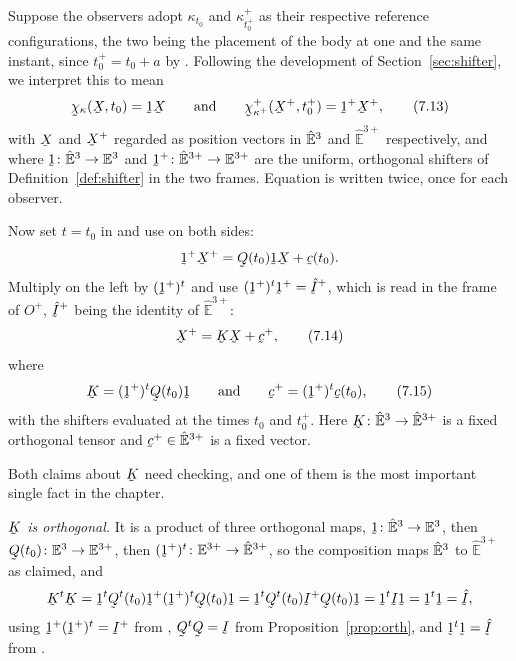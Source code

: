 Suppose the observers adopt $\kappa_{t_{0}}$ and $\kappa^{+}_{t^{+}_{0}}$
as their respective reference configurations, the two being the placement
of the body at one and the same instant, since $t^{+}_{0}=t_{0}+a$ by
. Following the development of Section~\ref{sec:shifter}, we
interpret this to mean
\begin{equation}
   \bchi_{\kappa}(\bX,t_{0})=\shift\bX
   \qquad\text{and}\qquad
   \bchi^{+}_{\kappa^{+}}(\bX^{+},t^{+}_{0})=\shift^{+}\bX^{+},
   \tag{7.13}\label{eq:7.13}
\end{equation}
with $\bX$ and $\bX^{+}$ regarded as position vectors in $\hat{\mathbb{E}}^{3}$ and
$\hat{\mathbb{E}}^{3+}$ respectively, and where
$\shift\colon\hEt\to\Et$ and
$\shift^{+}\colon\hat{\mathbb{E}}^{3+}\to\mathbb{E}^{3+}$ are the
uniform, orthogonal shifters of Definition~\ref{def:shifter} in the two
frames. Equation  is  written twice, once for each
observer.

Now set $t=t_{0}$ in  and use  on both sides:
\[
   \shift^{+}\bX^{+}=\bQ(t_{0})\shift\bX+\bc(t_{0}).
\]
Multiply on the left by $(\shift^{+})^{t}$ and use
$(\shift^{+})^{t}\shift^{+}=\hI^{+}$, which is  read in the
frame of $O^{+}$, $\hI^{+}$ being the identity of
$\hat{\mathbb{E}}^{3+}$:
\begin{equation}
   \bX^{+}=\bK\bX+\bc^{+},
   \tag{7.14}\label{eq:7.14}
\end{equation}
where
\begin{equation}
   \bK=(\shift^{+})^{t}\bQ(t_{0})\shift
   \qquad\text{and}\qquad
   \bc^{+}=(\shift^{+})^{t}\bc(t_{0}),
   \tag{7.15}\label{eq:7.15}
\end{equation}
with the shifters evaluated at the times $t_{0}$ and $t^{+}_{0}$. Here
$\bK\colon\hEt\to\hat{\mathbb{E}}^{3+}$ is a fixed orthogonal tensor and
$\bc^{+}\in\hat{\mathbb{E}}^{3+}$ is a fixed vector.

Both claims about $\bK$ need checking, and one of them is the most
important single fact in the chapter.

\emph{$\bK$ is orthogonal.} It is a product of three orthogonal maps,
$\shift\colon\hEt\to\Et$, then $\bQ(t_{0})\colon\Et\to\mathbb{E}^{3+}$,
then $(\shift^{+})^{t}\colon\mathbb{E}^{3+}\to\hat{\mathbb{E}}^{3+}$, so
the composition maps $\hat{\mathbb{E}}^{3}$ to $\hat{\mathbb{E}}^{3+}$ as claimed, and
\[
   \bK^{t}\bK=\shift^{t}\bQ^{t}(t_{0})\shift^{+}(\shift^{+})^{t}
   \bQ(t_{0})\shift
   =\shift^{t}\bQ^{t}(t_{0})\I^{+}\bQ(t_{0})\shift
   =\shift^{t}\I\shift=\shift^{t}\shift=\hI ,
\]
using $\shift^{+}(\shift^{+})^{t}=\I^{+}$ from ,
$\bQ^{t}\bQ=\I$ from Proposition~\ref{prop:orth}, and
$\shift^{t}\shift=\hI$ from .

